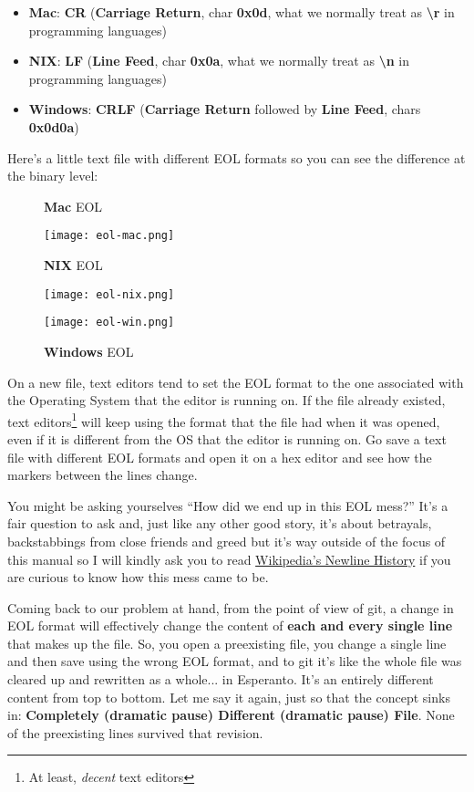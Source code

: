 \begin{itemize}
	\item {\bf Mac}: {\bf CR} ({\bf Carriage Return}, char {\bf 0x0d}, what we normally treat as {\bf {\textbackslash}r} in programming languages)
	\item {\bf NIX}: {\bf LF} ({\bf Line Feed}, char {\bf 0x0a}, what we normally treat as {\bf {\textbackslash}n} in programming languages)
	\item {\bf Windows}: {\bf CRLF} ({\bf Carriage Return} followed by {\bf Line Feed}, chars {\bf 0x0d0a})
\end{itemize}

Here's a little text file with different EOL formats so you can see the difference at the binary level:
\begin{figure}
	\centering
	\caption{{\bf Mac} EOL}
	\texttt{[image: eol-mac.png]}
	\caption{{\bf NIX} EOL}
	\texttt{[image: eol-nix.png]}
	\caption{{\bf Windows} EOL}
	\texttt{[image: eol-win.png]}
\end{figure}

On a new file, text editors tend to set the EOL format to the one associated with the Operating System that the editor is running on.
If the file already existed, text editors\footnote{At least, {\it decent} text editors} will keep using the format that the file had
when it was opened, even if it is different from the OS that the editor is running on. Go save a text file with different EOL formats
and open it on a hex editor and see how the markers between the lines change.

You might be asking yourselves ``How did we end up in this EOL mess?'' It's a fair question to ask and, just like any other good story,
it's about betrayals, backstabbings from close friends and greed but it's way outside of the focus of this manual so I will kindly ask you to
read \href{https://en.wikipedia.org/wiki/Newline#History}{Wikipedia's Newline History} if you are curious to know how this mess came
to be.

Coming back to our problem at hand, from the point of view of git, a change in EOL format will effectively change the content of
{\bf each and every single line} that makes up the file. So, you open a preexisting file, you change a single line and then save using
the wrong EOL format, and to git it's like the whole file was cleared up and rewritten as a whole... in Esperanto. It's an entirely
different content from top to bottom. Let me say it again, just so that the concept sinks in: {\bf Completely (dramatic pause) Different
(dramatic pause) File}. None of the preexisting lines survived that revision.

